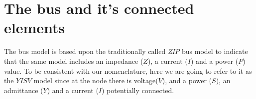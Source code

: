 \documentclass[nols,a4paper,twoside,notoc,fleqn]{tufte-book}
\begin{document}
%


\section{The bus and it's connected elements}

The bus model is based upon the traditionally called \textit{ZIP} bus model to indicate that the same model includes an impedance ($Z$), a current ($I$) and a power ($P$) value. To be consistent with our nomenclature, here we are going to refer to it as the $YISV$ model since at the node there is voltage($V$), and a power ($S$), an admittance ($Y$) and a current ($I$) potentially connected.
\end{document}
